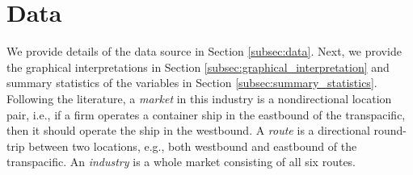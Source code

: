 \documentclass[11pt]{article}
\begin{document}
\section{Data}\label{sec:data}

We provide details of the data source in Section \ref{subsec:data}. Next, we provide the graphical interpretations in Section \ref{subsec:graphical_interpretation} and summary statistics of the variables in Section \ref{subsec:summary_statistics}. Following the literature, a \textit{market} in this industry is a nondirectional location pair, i.e., if a firm operates a container ship in the eastbound of the transpacific, then it should operate the ship in the westbound. A \textit{route} is a directional round-trip between two locations, e.g., both westbound and eastbound of the transpacific. An \textit{industry} is a whole market consisting of all six routes.
\end{document}
